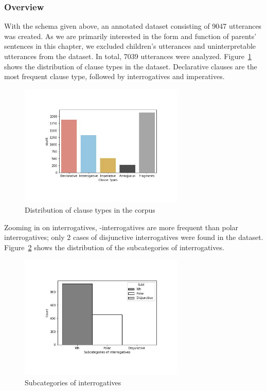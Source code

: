 \subsubsection{Overview}
With the schema given above, an annotated dataset consisting of 9047 utterances was created. As we are primarily interested in the form and function of parents' sentences in this chapter, we excluded children's utterances and uninterpretable utterances from the dataset. In total, 7039 utterances were analyzed.  Figure~\ref{fig:real-cldist} shows the distribution of clause types in the dataset. Declarative clauses are the most frequent clause type, followed by interrogatives and imperatives. 


\begin{figure}[H]
    \centering
    \includegraphics[width=0.7\textwidth]{figures/real-cldist.jpg}
    \caption{Distribution of clause types in the corpus}
    \label{fig:real-cldist}
\end{figure}

Zooming in on interrogatives, \twh-interrogatives are more frequent than polar interrogatives; only 2 cases of disjunctive interrogatives were found in the dataset. Figure~\ref{fig:real-subI} shows the distribution of the subcategories of interrogatives. 

\begin{figure}[H]
    \centering
    \includegraphics[width=0.7\textwidth]{figures/real-subI.jpg}
    \caption{Subcategories of interrogatives}
    \label{fig:real-subI}
\end{figure}

